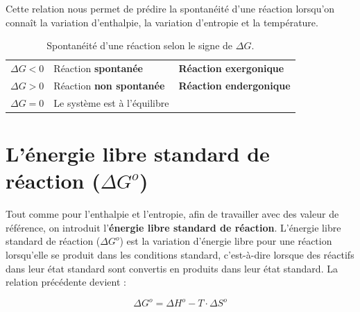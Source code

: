 \documentclass[
  11pt,
  a4paper,
  openany]{book}
\begin{document}
Cette relation nous permet de prédire la spontanéité d'une réaction lorsqu'on connaît la variation d'enthalpie, la variation d'entropie et la température.

\begin{longtable}[]{@{}
  >{\centering\arraybackslash}p{}
  >{\raggedright\arraybackslash}p{}
  >{\raggedright\arraybackslash}p{}@{}}
\caption{\label{tab:spontaneitedHdS} Spontanéité d'une réaction selon le signe de \(\Delta G\).}\tabularnewline
\toprule()
\endhead
\(\Delta G < 0\) & Réaction \textbf{spontanée} & \textbf{Réaction exergonique} \\
\(\Delta G > 0\) & Réaction \textbf{non spontanée} & \textbf{Réaction endergonique} \\
\(\Delta G = 0\) & Le système est à l'équilibre & \\
\bottomrule()
\end{longtable}

\hypertarget{luxe9nergie-libre-standard-de-ruxe9action-delta-go}{%
\section{\texorpdfstring{L'énergie libre standard de réaction (\(\Delta G^o\))}{L'énergie libre standard de réaction (\textbackslash Delta G\^{}o)}}\label{luxe9nergie-libre-standard-de-ruxe9action-delta-go}}

Tout comme pour l'enthalpie et l'entropie, afin de travailler avec des valeur de référence, on introduit l'\textbf{énergie libre standard de réaction}. L'énergie libre standard de réaction (\(\Delta G^o\)) est la variation d'énergie libre pour une réaction lorsqu'elle se produit dans les conditions standard, c'est-à-dire lorsque des réactifs dans leur état standard sont convertis en produits dans leur état standard. La relation précédente devient :

\[
\Delta G^o = \Delta H^o - T \cdot \Delta S^o
\]
\end{document}
